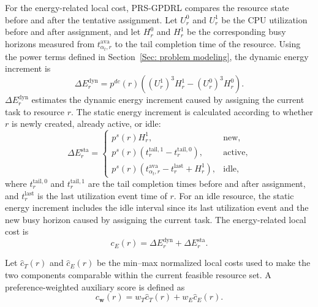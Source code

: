 \documentclass[10pt,journal]{IEEEtran}
\begin{document}
For the energy-related local cost, PRS-GPDRL compares the resource state before and after the tentative assignment. Let $U_r^0$ and $U_r^1$ be the CPU utilization before and after assignment, and let $H_r^0$ and $H_r^1$ be the corresponding busy horizons measured from $t_{\alpha_t,r}^{\mathrm{ava}}$ to the tail completion time of the resource. Using the power terms defined in Section~\ref{Sec: problem modeling}, the dynamic energy increment is
\begin{equation}
    \Delta E_r^{\mathrm{dyn}} =
    p^{dc}(r)
    \left(
    (U_r^1)^3 H_r^1
    -
    (U_r^0)^3 H_r^0
    \right).
    \label{Eq: dynamic energy increment}
\end{equation}
\(\Delta E_r^{\mathrm{dyn}}\) estimates the dynamic energy increment caused by assigning the current task to resource $r$. The static energy increment is calculated according to whether $r$ is newly created, already active, or idle:
\begin{equation}
    \Delta E_r^{\mathrm{sta}} =
    \begin{cases}
    p^s(r) H_r^1, & \text{new},\\
    p^s(r)\left(t_r^{\mathrm{tail},1}-t_r^{\mathrm{tail},0}\right),
    & \text{active},\\
    p^s(r)\left(t_{\alpha_t,r}^{\mathrm{ava}}-t_r^{\mathrm{last}}+H_r^1\right),
    & \text{idle},
    \end{cases}
    \label{Eq: static energy increment}
\end{equation}
where $t_r^{\mathrm{tail},0}$ and $t_r^{\mathrm{tail},1}$ are the tail completion times before and after assignment, and $t_r^{\mathrm{last}}$ is the last utilization event time of $r$. For an idle resource, the static energy increment includes the idle interval since its last utilization event and the new busy horizon caused by assigning the current task. The energy-related local cost is
\begin{equation}
    c_E(r)=\Delta E_r^{\mathrm{dyn}}+\Delta E_r^{\mathrm{sta}}.
    \label{Eq: energy local cost}
\end{equation}

Let $\hat{c}_T(r)$ and $\hat{c}_E(r)$ be the min--max normalized local costs used to make the two components comparable within the current feasible resource set. A preference-weighted auxiliary score is defined as
\begin{equation}
    c_{\mathbf{w}}(r) = w_T \hat{c}_T(r) + w_E \hat{c}_E(r).
    \label{Eq: preference-weighted auxiliary score}
\end{equation}
\end{document}
